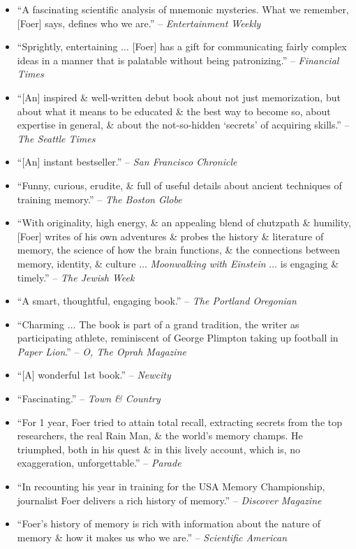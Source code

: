 \documentclass{article}
\begin{document}
\begin{enumerate}
\begin{itemize}
		\item ``A fascinating scientific analysis of mnemonic mysteries. What we remember, [{\sc Foer}] says, defines who we are.'' -- {\it Entertainment Weekly}
		\item ``Sprightly, entertaining $\ldots$ [{\sc Foer}] has a gift for communicating fairly complex ideas in a manner that is palatable without being patronizing.'' -- {\it Financial Times}
		\item ``[An] inspired \& well-written debut book about not just memorization, but about what it means to be educated \& the best way to become so, about expertise in general, \& about the not-so-hidden `secrets' of acquiring skills.'' -- {\it The Seattle Times}
		\item ``[An] instant bestseller.'' -- {\it San Francisco Chronicle}
		\item ``Funny, curious, erudite, \& full of useful details about ancient techniques of training memory.'' -- {\it The Boston Globe}
		\item ``With originality, high energy, \& an appealing blend of chutzpath \& humility, [{\sf Foer}] writes of his own adventures \& probes the history \& literature of memory, the science of how the brain functions, \& the connections between memory, identity, \& culture $\ldots$ {\it Moonwalking with {\sc Einstein}} $\ldots$ is engaging \& timely.'' -- {\it The Jewish Week}
		\item ``A smart, thoughtful, engaging book.'' -- {\it The Portland Oregonian}
		\item ``Charming $\ldots$ The book is part of a grand tradition, the writer as participating athlete, reminiscent of {\sc George Plimpton} taking up football in {\it Paper Lion}.'' -- {\it O, The Oprah Magazine}
		\item ``[A] wonderful 1st book.'' -- {\it Newcity}
		\item ``Fascinating.'' -- {\it Town \& Country}
		\item ``For 1 year, {\sc Foer} tried to attain total recall, extracting secrets from the top researchers, the real Rain Man, \& the world's memory champs. He triumphed, both in his quest \& in this lively account, which is, no exaggeration, unforgettable.'' -- {\it Parade}
		\item ``In recounting his year in training for the USA Memory Championship, journalist {\sf Foer} delivers a rich history of memory.'' -- {\it Discover Magazine}
		\item ``{\sf Foer}'s history of memory is rich with information about the nature of memory \& how it makes us who we are.'' -- {\it Scientific American}

\end{itemize}
\end{enumerate}
\end{document}
